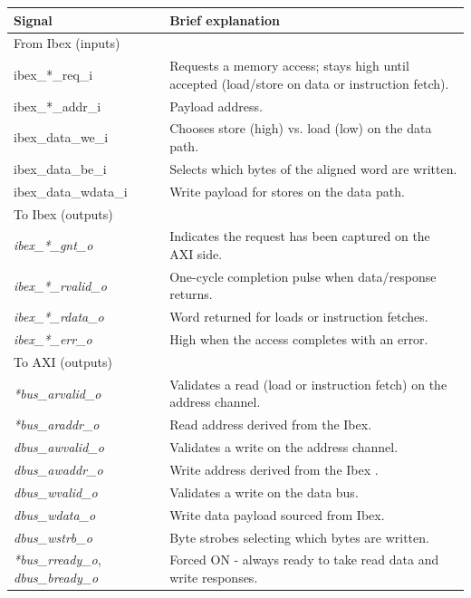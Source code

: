 \begin{table}[H]
\setlength{\textfloatsep}{3pt}    
\setlength{\intextsep}{3pt}       
\centering
\begin{tabularx}{\textwidth}{|l|X|}
\hline
Signal & Brief explanation \\
\hline
\multicolumn{2}{|l|}{From Ibex (inputs)} \\
\hline
ibex\_*\_req\_i & Requests a memory access; stays high until accepted (load/store on data or instruction fetch). \\
ibex\_*\_addr\_i & Payload address. \\
ibex\_data\_we\_i & Chooses store (high) vs. load (low) on the data path. \\
ibex\_data\_be\_i & Selects which bytes of the aligned word are written. \\
ibex\_data\_wdata\_i & Write payload for stores on the data path. \\
\hline
\multicolumn{2}{|l|}{To Ibex (outputs)} \\
\hline
\textit{ibex\_*\_gnt\_o} & Indicates the request has been captured on the AXI side. \\
\textit{ibex\_*\_rvalid\_o} & One-cycle completion pulse when data/response returns. \\
\textit{ibex\_*\_rdata\_o} & Word returned for loads or instruction fetches. \\
\textit{ibex\_*\_err\_o} & High when the access completes with an error. \\
\hline
\multicolumn{2}{|l|}{To AXI (outputs)} \\
\hline
\textit{*bus\_arvalid\_o} & Validates a read (load or instruction fetch) on the address channel. \\
\textit{*bus\_araddr\_o} & Read address derived from the Ibex. \\
\textit{dbus\_awvalid\_o} & Validates a write on the address channel. \\
\textit{dbus\_awaddr\_o} & Write address derived from the Ibex . \\
\textit{dbus\_wvalid\_o} & Validates a write on the data bus. \\
\textit{dbus\_wdata\_o} & Write data payload sourced from Ibex. \\
\textit{dbus\_wstrb\_o} & Byte strobes selecting which bytes are written. \\
\textit{*bus\_rready\_o}, \textit{dbus\_bready\_o} & Forced ON - always ready to take read data and write responses. \\

\end{tabularx}
\end{table}
